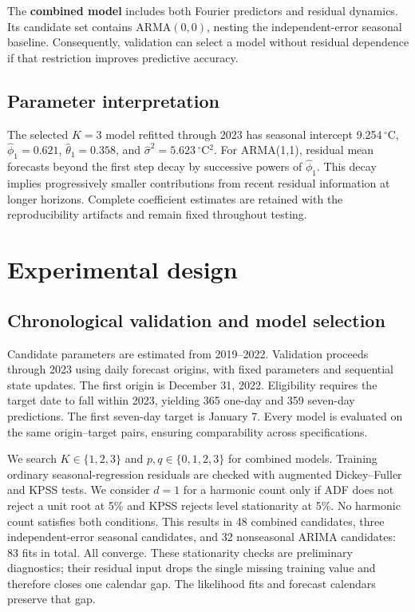 \documentclass{article}
\begin{document}
The \textbf{combined model} includes both Fourier predictors and residual
dynamics. Its candidate set contains ARMA$(0,0)$, nesting the independent-error
seasonal baseline. Consequently, validation can select a model without
residual dependence if that restriction improves predictive accuracy.

\subsection{Parameter interpretation}
The selected $K=3$ model refitted through 2023 has seasonal intercept
9.254\,$^\circ$C, $\widehat\phi_1=0.621$, $\widehat\theta_1=0.358$, and
$\widehat\sigma^2=5.623$\,$^\circ$C$^2$. For ARMA(1,1), residual mean forecasts
beyond the first step decay by successive powers of $\widehat\phi_1$.
This decay implies progressively smaller contributions from recent residual
information at longer horizons. Complete coefficient estimates are retained
with the reproducibility artifacts and remain fixed throughout testing.

\newpage
\section{Experimental design}
\subsection{Chronological validation and model selection}
Candidate parameters are estimated from 2019--2022. Validation proceeds through
2023 using daily forecast origins, with fixed parameters and sequential state
updates. The first origin is December 31, 2022. Eligibility requires the target
date to fall within 2023, yielding 365 one-day and 359 seven-day predictions.
The first seven-day target is January 7. Every model is evaluated on the
same origin--target pairs, ensuring comparability across specifications.

We search $K\in\{1,2,3\}$ and $p,q\in\{0,1,2,3\}$ for combined models.
Training ordinary seasonal-regression residuals are checked with augmented
Dickey--Fuller and KPSS tests. We consider $d=1$ for a harmonic count only if
ADF does not reject a unit root at 5\% and KPSS rejects level stationarity at
5\%. No harmonic count satisfies both conditions. This results in 48 combined
candidates, three independent-error seasonal candidates, and 32 nonseasonal
ARIMA candidates: 83 fits in total. All converge. These stationarity checks
are preliminary diagnostics; their residual input drops the single missing
training value and therefore closes one calendar gap. The likelihood fits and
forecast calendars preserve that gap.
\end{document}
